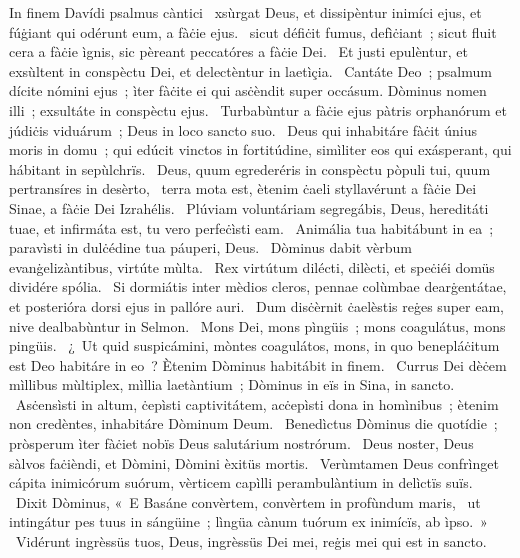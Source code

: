 { In finem Davídi psalmus càntici}
{%
~xsùrgat Deus, et dissipèntur inimíci ejus, et fúġiant qui odérunt eum, a fàċie ejus. 
~sicut défiċit fumus, defìċiant~; sicut fluit cera a fàċie ìgnis, sic pèreant peccatóres a fàċie Dei. 
~Et justi epulèntur, et exsùltent in conspèctu Dei, et delectèntur in laetìçia. 
~Cantáte Deo~; psalmum dícite nómini ejus~; ìter fàċite ei qui asċèndit super occásum. Dòminus nomen illi~; exsultáte in conspèctu ejus. 
~Turbabùntur a fàċie ejus pàtris orphanórum et júdiċis viduárum~; Deus in loco sancto suo. 
~Deus qui inhabitáre fàċit únius moris in domu~; qui edúcit vinctos in fortitúdine, simìliter eos qui exásperant, qui hábitant in sepùlchrïs. 
~Deus, quum egrederéris in conspèctu pòpuli tui, quum pertransíres in desèrto, 
~terra mota est, ètenim ċaeli styllavérunt a fàċie Dei Sinae, a fàċie Dei Izrahélis. 
~Plúviam voluntáriam segregábis, Deus, hereditáti tuae, et infirmáta est, tu vero perfeċìsti eam. 
~Animália tua habitábunt in ea~; paravìsti in dulċédine tua páuperi, Deus. 
~Dòminus dabit vèrbum evanġelizàntibus, virtúte mùlta. 
~Rex virtútum dilécti, dilècti, et speċiéi domüs dividére spólia. 
~Si dormiátis inter mèdios cleros, pennae colùmbae dearġentátae, et posterióra dorsi ejus in pallóre auri. 
~Dum disċèrnit ċaelèstis reġes super eam, nive dealbabùntur in Selmon. 
~Mons Dei, mons pìngüis~; mons coagulátus, mons pingüis. 
~¿~Ut quid suspicámini, mòntes coagulátos, mons, in quo benepláċitum est Deo habitáre in eo~? Ètenim Dòminus habitábit in finem. 
~Currus Dei dèċem mìllibus mùltiplex, mìllia laetàntium~; Dòminus in eïs in Sina, in sancto. 
~Asċensìsti in altum, ċepìsti captivitátem, acċepìsti dona in homìnibus~; ètenim non credèntes, inhabitáre Dòminum Deum. 
~Benedìctus Dòminus die quotídie~; pròsperum ìter fàċiet nobïs Deus salutárium nostrórum. 
~Deus noster, Deus sàlvos faċièndi, et Dòmini, Dòmini èxitüs mortis. 
~Verùmtamen Deus confrìnget cápita inimicórum suórum, vèrticem capìlli perambulàntium in delìctïs suïs. 
~Dixit Dòminus, «~E Basáne convèrtem, convèrtem in profùndum maris, 
~ut intingátur pes tuus in sángüine~; lìngüa cànum tuórum ex inimícïs, ab ìpso.~»
~Vidérunt ingrèssüs tuos, Deus, ingrèssüs Dei mei, reġis mei qui est in sancto. 
}
